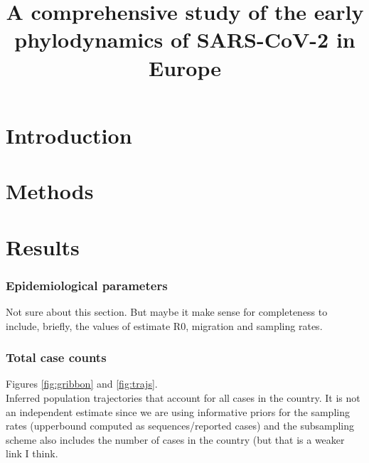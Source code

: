 \documentclass[12pt,]{article}
\title{A comprehensive study of the early phylodynamics of SARS-CoV-2 in Europe}
\begin{document}
\maketitle


\section*{Introduction}

\section*{Methods}

\section*{Results}

\subsubsection*{Epidemiological parameters}

Not sure about this section. But maybe it make sense for completeness to include, briefly, the values of estimate R0, migration and sampling rates.

\subsubsection*{Total case counts}

Figures \ref{fig:gribbon} and \ref{fig:trajs}.\\

Inferred population trajectories that account for all cases in the country. It is not an independent estimate since we are using informative priors for the sampling rates (upperbound computed as sequences/reported cases) and the subsampling scheme also includes the number of cases in the country (but that is a weaker link I think.\\
\end{document}
